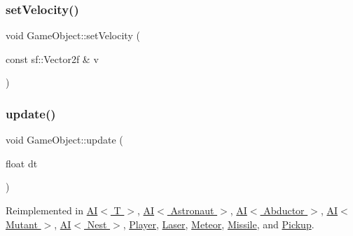 \subsubsection{\texorpdfstring{set\+Velocity()}{setVelocity()}}
{\footnotesize\ttfamily void Game\+Object\+::set\+Velocity (\begin{DoxyParamCaption}\item[{const sf\+::\+Vector2f \&}]{v }\end{DoxyParamCaption})}

\mbox{\label{class_game_object_a2fece397b6343682d639f8943f124d0e}} 
\subsubsection{\texorpdfstring{update()}{update()}}
{\footnotesize\ttfamily void Game\+Object\+::update (\begin{DoxyParamCaption}\item[{float}]{dt }\end{DoxyParamCaption})\hspace{0.3cm}{\ttfamily [virtual]}}



Reimplemented in \hyperlink{class_a_i_a1e1875bffd6f4da9e8333cba89aa3cd7}{A\+I$<$ T $>$}, \hyperlink{class_a_i_a1e1875bffd6f4da9e8333cba89aa3cd7}{A\+I$<$ Astronaut $>$}, \hyperlink{class_a_i_a1e1875bffd6f4da9e8333cba89aa3cd7}{A\+I$<$ Abductor $>$}, \hyperlink{class_a_i_a1e1875bffd6f4da9e8333cba89aa3cd7}{A\+I$<$ Mutant $>$}, \hyperlink{class_a_i_a1e1875bffd6f4da9e8333cba89aa3cd7}{A\+I$<$ Nest $>$}, \hyperlink{class_player_abe2902b7decc38472183a08977eeb57f}{Player}, \hyperlink{class_laser_af692c14903cce59991bdd9cc9f78aeb3}{Laser}, \hyperlink{class_meteor_a141f6128d03a106bad61db3778404be7}{Meteor}, \hyperlink{class_missile_a5750280ac2f18df9cf3f5f87341be655}{Missile}, and \hyperlink{class_pickup_a009910dfc9488746b3944cfcdd5be7e9}{Pickup}.

